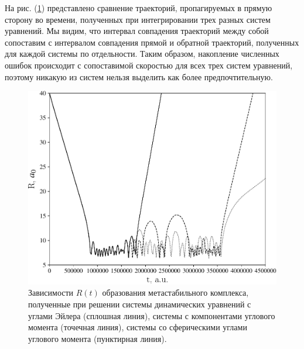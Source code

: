 На рис. (\ref{fig:trajectory-comparison}) представлено сравнение траекторий, пропагируемых в прямую сторону во времени, полученных при интегрировании трех разных систем уравнений. Мы видим, что интервал совпадения траекторий между собой сопоставим с интервалом совпадения прямой и обратной траекторий, полученных для каждой системы по отдельности. Таким образом, накопление численных ошибок происходит с сопоставимой скоростью для всех трех систем уравнений, поэтому никакую из систем нельзя выделить как более предпочтительную. \par

\begin{figure}[H]
    \centering
    \includegraphics[width=0.75\linewidth]{./pictures/trajectories/trajectory-comparison-crop.pdf}
    \caption{Зависимости $R(t)$ образования метастабильного комплекса, полученные при решении системы динамических уравнений с углами Эйлера (сплошная линия), системы с компонентами углового момента (точечная линия), системы со сферическими углами углового момента (пунктирная линия).}
    \label{fig:trajectory-comparison}
\end{figure}

